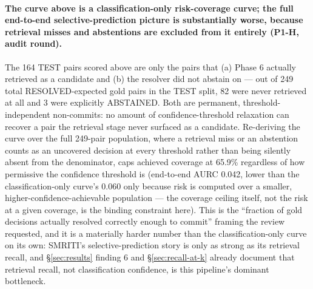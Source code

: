 \paragraph{The curve above is a classification-only risk-coverage
curve; the full end-to-end selective-prediction picture is
substantially worse, because retrieval misses and abstentions are
excluded from it entirely (P1-H, audit round).} The 164 TEST pairs
scored above are only the pairs that (a) Phase 6 actually retrieved as a
candidate and (b) the resolver did not abstain on --- out of 249 total
RESOLVED-expected gold pairs in the TEST split, 82 were never retrieved
at all and 3 were explicitly ABSTAINED. Both are permanent,
threshold-independent non-commits: no amount of confidence-threshold
relaxation can recover a pair the retrieval stage never surfaced as a
candidate. Re-deriving the curve over the full 249-pair population,
where a retrieval miss or an abstention counts as an uncovered decision
at every threshold rather than being silently absent from the
denominator, caps achieved coverage at 65.9\% regardless of how
permissive the confidence threshold is (end-to-end AURC 0.042, lower
than the classification-only curve's 0.060 only because risk is
computed over a smaller, higher-confidence-achievable population --- the
coverage ceiling itself, not the risk at a given coverage, is the
binding constraint here). This is the ``fraction of gold decisions
actually resolved correctly enough to commit'' framing the review
requested, and it is a materially harder number than the
classification-only curve on its own: SMRITI's selective-prediction
story is only as strong as its retrieval recall, and \S\ref{sec:results}
finding 6 and \S\ref{sec:recall-at-k} already document that retrieval
recall, not classification confidence, is this pipeline's dominant
bottleneck.

